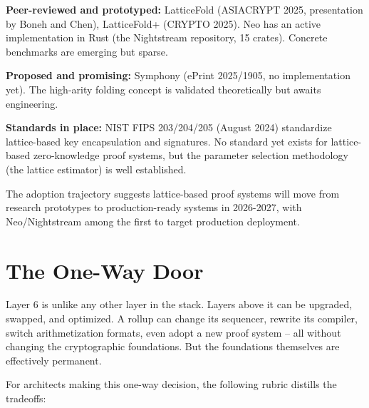\documentclass[
  11pt,
  openany]{report}
\renewcommand{\textbf}[1]{{\bfseries\color{MidnightBold}#1}}
\begin{document}
\textbf{Peer-reviewed and prototyped:} LatticeFold (ASIACRYPT 2025, presentation
by Boneh and Chen), LatticeFold+ (CRYPTO 2025). Neo has an active implementation
in Rust (the Nightstream repository, 15 crates). Concrete benchmarks are
emerging but sparse.

\textbf{Proposed and promising:} Symphony (ePrint 2025/1905, no implementation
yet). The high-arity folding concept is validated theoretically but awaits
engineering.

\textbf{Standards in place:} NIST FIPS 203/204/205 (August 2024) standardize
lattice-based key encapsulation and signatures. No standard yet exists for
lattice-based zero-knowledge proof systems, but the parameter selection
methodology (the lattice estimator) is well established.

The adoption trajectory suggests lattice-based proof systems will move from
research prototypes to production-ready systems in 2026-2027, with
Neo/Nightstream among the first to target production deployment.

\section{The One-Way Door}\label{the-one-way-door}

Layer 6 is unlike any other layer in the stack. Layers above it can be upgraded,
swapped, and optimized. A rollup can change its sequencer, rewrite its compiler,
switch arithmetization formats, even adopt a new proof system -- all without
changing the cryptographic foundations. But the foundations themselves are
effectively permanent.

For architects making this one-way decision, the following rubric distills the
tradeoffs:
\end{document}
